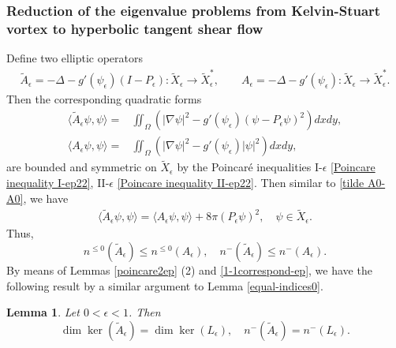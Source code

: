 \documentclass[1 [leqno, 11pt]{amsart}
\numberwithin{equation}{section}
\let\ep=\epsilon
\newtheorem{lemma}[Theorem]{Lemma}
\begin{document}
\begin{CJK*}{GBK}{song}
\subsubsection{Reduction of the eigenvalue problems from Kelvin-Stuart vortex to hyperbolic tangent shear flow}

Define two elliptic operators
 \begin{align}\label{tilde-A-ep-A-ep}
 \tilde{A}_\ep=-\Delta-g'(\psi_\ep)(I - P_\ep): \tilde{X}_\ep \rightarrow \tilde{X}_\ep^*,\quad\quad
 A_\ep =-\Delta -g'(\psi_\ep):\tilde{X}_\ep \rightarrow \tilde{X}_\ep^*.
\end{align}
Then the corresponding quadratic forms
\begin{align*}
 \langle\tilde{A}_\ep\psi,\psi\rangle=&\iint_\Omega\left(|\nabla\psi|^2-g'(\psi_\ep)(\psi - P_\ep\psi)^2\right)dxdy,\\
 \langle A_\ep \psi,\psi\rangle=&\iint_{\Omega}\left(|\nabla \psi|^2-g'(\psi_\ep)|\psi|^2\right)dxdy,
\end{align*}
are bounded and symmetric on $\tilde{X}_\ep$ by the Poincar\'e inequalities I-$\ep$ \eqref{Poincare inequality I-ep22}, II-$\ep$ \eqref{Poincare inequality II-ep22}.
Then similar to \eqref{tilde A0-A0}, we have
\begin{align*}
\langle\tilde  A_\ep \psi,\psi\rangle=\langle A_\ep \psi,\psi\rangle+8\pi(P_\ep \psi)^2,\quad\psi\in \tilde X_\ep.
\end{align*}
Thus,
\begin{equation*}
n^{\leq0}(\tilde A_\ep)\leq n^{\leq0}(A_\ep),\quad n^{-}(\tilde A_\ep)\leq n^{-}(A_\ep).
\end{equation*}
By means of Lemmas \ref{poincare2ep} (2) and \ref{1-1correspond-ep}, we have the following result by a similar argument to Lemma \ref{equal-indices0}.

\begin{lemma}\label{equal-indices} Let $0<\epsilon<1$. Then
$$\dim \ker (\tilde{A}_\ep) = \dim \ker (L_\ep), \quad n^-(\tilde{A}_\ep) = n^-(L_\ep).$$
\end{lemma}


\end{CJK*}
\end{document}

